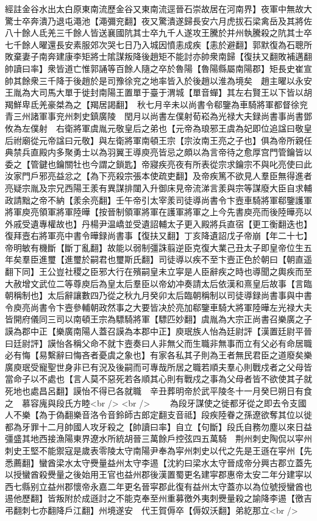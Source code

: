 經註金谷水出太白原東南流歷金谷又東南流逕晉石崇故居在河南界】夜軍中無故大驚士卒奔潰乃退屯澠池【澠彌兖翻】夜又驚潰遂歸長安六月虎拔石梁禽岳及其將佐八十餘人氐羌三千餘人皆送襄國阬其士卒九千人遂攻王騰於并州執騰殺之阬其士卒七千餘人曜還長安素服郊次哭七日乃入城因憤恚成疾【恚於避翻】郭默復為石聰所敗棄妻子南奔建康李矩將士隂謀叛降後趙矩不能討亦帥衆南歸【復扶又翻敗補邁翻帥讀曰率】衆皆道亡惟郭誦等百餘人隨之卒於魯陽【魯陽縣屬南陽郡】矩長史崔宣帥其餘衆三千降于後趙於是司豫徐兖之地率皆入於後趙以淮為境矣　趙主曜以永安王胤為大司馬大單于徙封南陽王置單于臺于渭城【單音蟬】其左右賢王以下皆以胡羯鮮卑氐羌豪桀為之【羯居謁翻】　秋七月辛未以尚書令郗鑒為車騎將軍都督徐兖青三州諸軍事兖州刺史鎮廣陵　閏月以尚書左僕射荀崧為光禄大夫録尚書事尚書鄧攸為左僕射　右衛將軍虞胤元敬皇后之弟也【元帝為琅邪王虞為妃即位追諡曰敬皇后祔廟從元帝諡曰元敬】與左衛將軍南頓王宗【宗汝南王亮之子也】俱為帝所親任典禁兵直殿内多聚勇士以為羽翼王導庾亮皆忌之頗以為言帝待之愈厚宫門管鑰皆以委之【管鍵也鑰關牡也今謂之鎖匙】帝寢疾亮夜有所表從宗求鑰宗不與叱亮使曰此汝家門戶邪亮益忿之【為下亮殺宗張本使疏吏翻】及帝疾篤不欲見人羣臣無得進者亮疑宗胤及宗兄西陽王羕有異謀排闥入升御床見帝流涕言羕與宗等謀廢大臣自求輔政請黜之帝不納【羕余亮翻】壬午帝引太宰羕司徒導尚書令卞壼車騎將軍郗鑒護軍將軍庾亮領軍將軍陸曄【按晉制領軍將軍在護軍將軍之上今先書庾亮而後陸曄亮以外戚受遺專權故也】丹楊尹温嶠並受遺詔輔太子更入殿將兵直宿【更工衡翻迭也】復拜壼右將軍亮中書令曄録尚書事【復扶又翻】丁亥降遺詔戊子帝崩【年二十七】帝明敏有機斷【斷丁亂翻】故能以弱制彊誅翦逆臣克復大業己丑太子即皇帝位生五年矣羣臣進璽【進璽於嗣君也璽斯氏翻】司徒導以疾不至卞壼正色於朝曰【朝直遥翻下同】王公豈社稷之臣邪大行在殯嗣皇未立寜是人臣辭疾之時也導聞之輿疾而至大赦增文武位二等尊庾后為皇太后羣臣以帝幼冲奏請太后依漢和熹皇后故事【言臨朝稱制也】太后辭讓數四乃從之秋九月癸卯太后臨朝稱制以司徒導録尚書事與中書令庾亮尚書令卞壼參輔朝政然事之大要皆决於亮加郗鑒車騎大將軍陸曄左光禄大夫皆開府儀同三司以南頓王宗為驃騎將軍【驃匹妙翻】虞胤為大宗正尚書召樂廣之子謨為郡中正【樂廣南陽人蓋召謨為本郡中正】庾珉族人怡為廷尉評【漢置廷尉平晉曰廷尉評】謨怡各稱父命不就卞壼奏曰人非無父而生職非無事而立有父必有命居職必有悔【易繫辭曰悔吝者憂虞之象也】有家各私其子則為王者無民君臣之道廢矣樂廣庾珉受寵聖世身非已有況及後嗣而可專哉所居之職若順夫羣心則戰戍者之父母皆當命子以不處也【言人莫不惡死若各順其心則有戰戍之事為父母者皆不欲使其子就死地也處昌呂翻】謨怡不得已各就職　辛丑葬明帝於武平陵冬十一月癸巳朔日有食之　慕容廆與段氏方睦<br />
<br />
　　為段牙謀使之徙都牙從之即去令支國人不樂【為于偽翻樂音洛令音鈴師古郎定翻支音祗】段疾陸眷之孫遼欲奪其位以徙都為牙罪十二月帥國人攻牙殺之【帥讀曰率】自立【句斷】段氏自務勿塵以來日益彊盛其地西接漁陽東界遼水所統胡晉三萬餘戶控弦四五萬騎　荆州刺史陶侃以寜州刺史王堅不能禦寇是歲表零陵太守南陽尹奉為寜州刺史以代之先是王遜在寜州【先悉薦翻】蠻酋梁水太守㸑量益州太守李逷【沈約曰梁水太守晉成帝分興古郡立蓋先以授蠻酋殺㸑量之後始用王官也益州郡後漢置蜀更名建寜郡惠帝太安二年分建寜以西七縣别立益州郡懷帝永嘉二年更名晉寜郡此復有益州太守蓋亦以為位號授蠻酋也逷他歷翻】皆叛附於成遜討之不能克奉至州重募徼外夷刺㸑量殺之諭降李逷【徼吉弔翻刺七亦翻降戶江翻】州境遂安　代王賀傉卒【傉奴沃翻】弟紇那立<br />
